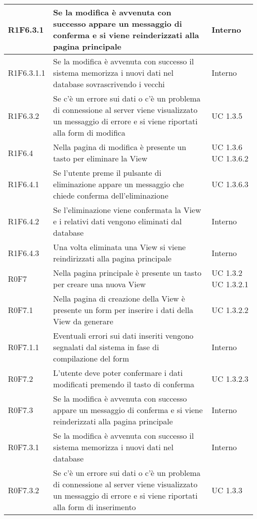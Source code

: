 \begin{center}
\begin{longtable}{| p{2cm} | p{8cm} | p{2cm} |}
		\hline
		R1F6.3.1  &  Se la modifica è avvenuta con successo appare un messaggio di conferma e si viene reinderizzati alla pagina principale  &  Interno \\
		\hline
		R1F6.3.1.1  &  Se la modifica è avvenuta con successo il sistema memorizza i nuovi dati nel database sovrascrivendo i vecchi  &  Interno \\
		\hline
		R1F6.3.2  &  Se c'è un errore sui dati o c'è un problema di connessione al server viene visualizzato un messaggio di errore e si viene riportati alla form di modifica  &  UC 1.3.5 \\
		\hline
		R1F6.4  &  Nella pagina di modifica è presente un tasto per eliminare la View  &  UC 1.3.6 \newline UC 1.3.6.2 \\
		\hline
		R1F6.4.1  &  Se l'utente preme il pulsante di eliminazione appare un messaggio che chiede conferma dell'eliminazione  &  UC 1.3.6.3 \\
		\hline
		R1F6.4.2  &  Se l'eliminazione viene confermata la View e i relativi dati vengono eliminati dal database  &  Interno \\
		\hline
		R1F6.4.3  &  Una volta eliminata una View si viene reindirizzati alla pagina principale  &  Interno \\
		\hline
		R0F7  &  Nella pagina principale è presente un tasto per creare una nuova View  &  UC 1.3.2 \newline UC 1.3.2.1 \\
		\hline
		R0F7.1  &  Nella pagina di creazione della View è presente un form per inserire i dati della View da generare  &  UC 1.3.2.2 \\
		\hline
		R0F7.1.1  &  Eventuali errori sui dati inseriti vengono segnalati dal sistema in fase di compilazione del form  &  Interno \\
		\hline
		R0F7.2  &  L'utente deve poter confermare i dati modificati premendo il tasto di conferma  &  UC 1.3.2.3 \\
		\hline
		R0F7.3  &  Se la modifica è avvenuta con successo appare un messaggio di conferma e si viene reinderizzati alla pagina principale  &  Interno \\
		\hline
		R0F7.3.1  &  Se la modifica è avvenuta con successo il sistema memorizza i nuovi dati nel database  &  Interno \\
		\hline
		R0F7.3.2  &  Se c'è un errore sui dati o c'è un problema di connessione al server viene visualizzato un messaggio di errore e si viene riportati alla form di inserimento  &  UC 1.3.3 \\

\end{longtable}
\end{center}
